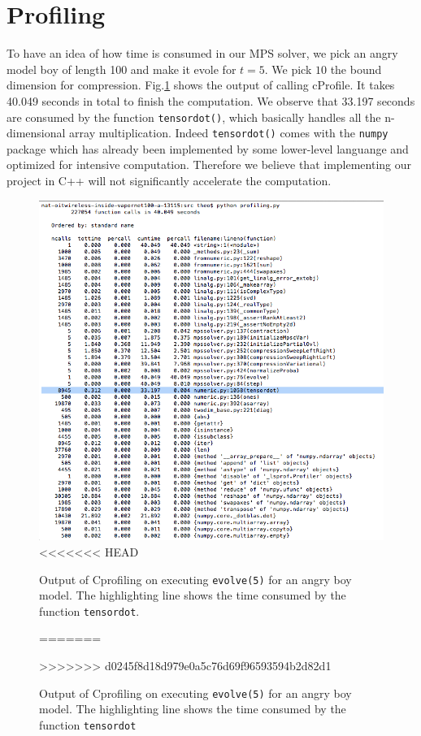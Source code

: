 \documentclass[english]{article}[12pt]
\begin{document}
\section{Profiling}
To have an idea of how time is consumed in our MPS solver, we pick an angry model boy of length 100 and make it evole for $t=5$. We pick $10$ the bound dimension for compression. Fig.\ref{fig:prof} shows the output of calling cProfile. It takes 40.049 seconds in total to finish the computation. We observe that 33.197 seconds are consumed by the function \texttt{tensordot()}, which basically handles all the n-dimensional array multiplication. Indeed \texttt{tensordot()} comes with the \texttt{numpy} package which has already been implemented by some lower-level languange and optimized for intensive computation. Therefore we believe that implementing our project in C++ will not significantly accelerate the computation. 
\begin{figure}[H]
\centering
\includegraphics[scale=0.4]{Result_Fig/profiling.png}
<<<<<<< HEAD
\caption{Output of Cprofiling on executing \texttt{evolve(5)} for an angry boy model. The highlighting line shows the time consumed by the function \texttt{tensordot}.}
=======
\caption{Output of Cprofiling on executing \texttt{evolve(5)} for an angry boy model. The highlighting line shows the time consumed by the function \texttt{tensordot}}
>>>>>>> d0245f8d18d979e0a5c76d69f96593594b2d82d1
\label{fig:prof}
\end{figure} 
\end{document}
